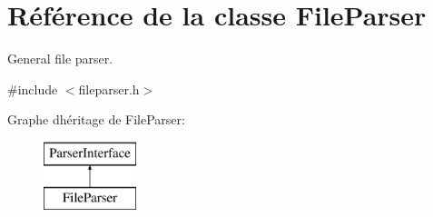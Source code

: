 \hypertarget{class_file_parser}{}\section{Référence de la classe File\+Parser}
\label{class_file_parser}


General file parser.  




{\ttfamily \#include $<$fileparser.\+h$>$}

Graphe d\textquotesingle{}héritage de File\+Parser\+:\begin{figure}[H]
\begin{center}
\leavevmode
\includegraphics[height=2.000000cm]{class_file_parser}
\end{center}
\end{figure}
